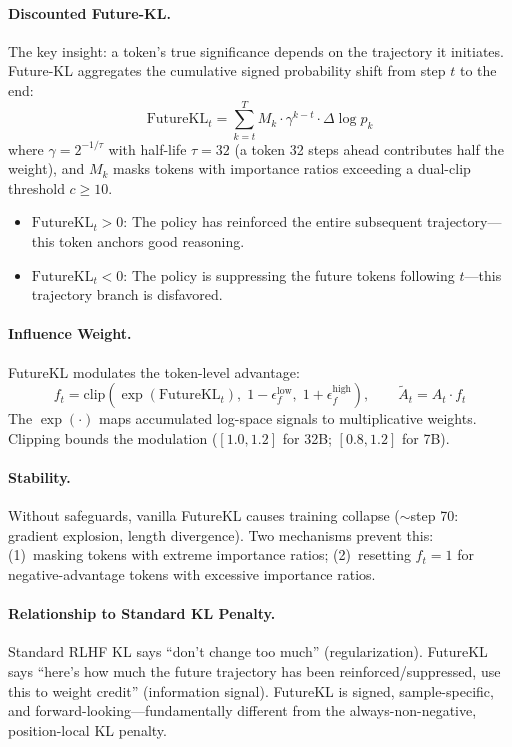 \documentclass[11pt]{article}
\begin{document}
\paragraph{Discounted Future-KL.}
The key insight: a token's true significance depends on the trajectory it initiates. Future-KL aggregates the cumulative signed probability shift from step $t$ to the end:
\begin{equation}
\mathrm{FutureKL}_t = \sum_{k=t}^{T} M_k \cdot \gamma^{k-t} \cdot \Delta \log p_k
\end{equation}
where $\gamma = 2^{-1/\tau}$ with half-life $\tau = 32$ (a token 32 steps ahead contributes half the weight), and $M_k$ masks tokens with importance ratios exceeding a dual-clip threshold $c \geq 10$.

\begin{itemize}
    \item $\mathrm{FutureKL}_t > 0$: The policy has reinforced the entire subsequent trajectory---this token anchors good reasoning.
    \item $\mathrm{FutureKL}_t < 0$: The policy is suppressing the future tokens following $t$---this trajectory branch is disfavored.
\end{itemize}

\paragraph{Influence Weight.}
FutureKL modulates the token-level advantage:
\begin{equation}
f_t = \mathrm{clip}\!\left(\exp(\mathrm{FutureKL}_t),\; 1 - \epsilon_f^{\mathrm{low}},\; 1 + \epsilon_f^{\mathrm{high}}\right), \qquad \tilde{A}_t = \hat{A}_t \cdot f_t
\end{equation}
The $\exp(\cdot)$ maps accumulated log-space signals to multiplicative weights. Clipping bounds the modulation ($[1.0, 1.2]$ for 32B; $[0.8, 1.2]$ for 7B).

\paragraph{Stability.}
Without safeguards, vanilla FutureKL causes training collapse ($\sim$step 70: gradient explosion, length divergence). Two mechanisms prevent this: (1)~masking tokens with extreme importance ratios; (2)~resetting $f_t = 1$ for negative-advantage tokens with excessive importance ratios.

\paragraph{Relationship to Standard KL Penalty.}
Standard RLHF KL says ``don't change too much'' (regularization). FutureKL says ``here's how much the future trajectory has been reinforced/suppressed, use this to weight credit'' (information signal). FutureKL is signed, sample-specific, and forward-looking---fundamentally different from the always-non-negative, position-local KL penalty.
\end{document}
